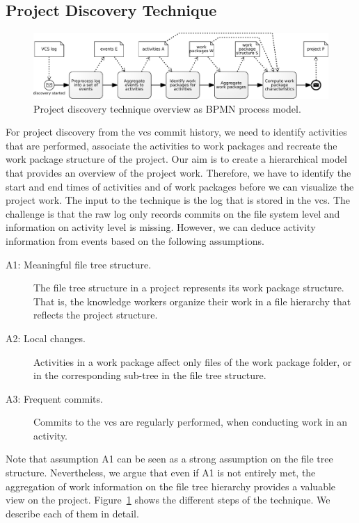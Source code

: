 \subsection{Project Discovery Technique}\label{sec:bpm2015:subsec:bpm2015:discovery_technique}
\begin{figure}[b]
\centering
\includegraphics[width=\textwidth]{bpm2015/imgs/Project_discovery}
\caption{Project discovery technique overview as BPMN process model.}
\label{fig:bpm2015:project_discovery_technique}
\end{figure}
For project discovery from the \gls{vcs} commit history, we need to identify activities that are performed, associate the activities to work packages and recreate the work package structure of the project.
Our aim is to create a hierarchical model that provides an overview of the project work.
Therefore, we have to identify the start and end times of activities and of work packages before we can visualize the project work. The input to the technique is the log that is stored in the \gls{vcs}. The challenge is that the raw log only records commits on the file system level and information on activity level is missing. However, we can deduce activity information from events based on the following assumptions.

\begin{description}
  \item[A1: Meaningful file tree structure.] The file tree structure in a project represents its work package structure. That is, the knowledge workers organize their work in a file hierarchy that reflects the project structure.
  \item[A2: Local changes.] Activities in a work package affect only files of the work package folder, or in the corresponding sub-tree in the file tree structure.
  \item[A3: Frequent commits.] Commits to the \gls{vcs} are regularly performed, when conducting work in an activity.
\end{description}

Note that assumption A1 can be seen as a strong assumption on the file tree structure. Nevertheless, we argue that even if A1 is not entirely met, the aggregation of work information on the file tree hierarchy provides a valuable view on the project.
Figure~\ref{fig:bpm2015:project_discovery_technique} shows the different steps of the technique. We describe each of them in detail.

